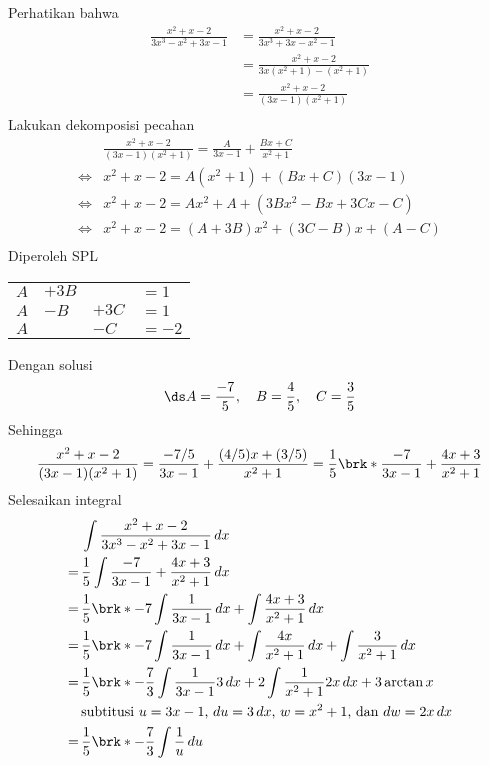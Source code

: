 \begin{enumerate}[leftmargin=*, label={\arabic*}.]
\begin{enumerate}[label={\alph*}.]
    Perhatikan bahwa 
    \begin{align*}
        \frac{x^{2}+x-2}{3x^{3}-x^{2}+3x-1} 
        &= \frac{x^{2}+x-2}{3x^{3}+3x-x^{2}-1}\\
        &= \frac{x^{2}+x-2}{3x(x^{2}+1)-(x^{2}+1)}\\
        &= \frac{x^{2}+x-2}{(3x-1)(x^{2}+1)}\\
    \end{align*}
    Lakukan dekomposisi pecahan
    \begin{align*}
        &\frac{x^{2}+x-2}{(3x-1)(x^{2}+1)} 
        = \frac{A}{3x-1}+\frac{Bx+C}{x^{2}+1}\\
        \iff & x^{2}+x-2 = A(x^{2}+1)+(Bx+C)(3x-1)\\
        \iff & x^{2}+x-2 = Ax^{2}+A+(3Bx^{2}-Bx+3Cx-C)\\
        \iff & x^{2}+x-2 = (A+3B)x^{2}+(3C-B)x+(A-C)\\
    \end{align*}
    Diperoleh SPL
    \begin{center}
    \begin{tabular}{llll}
        $A$ &$+3B$ & &$=1$\\
        $A$ &$-B$ &$+3C$ &$=1$\\
        $A$ & &$-C$ &$=-2$
    \end{tabular}
    \end{center}
    Dengan solusi 
    \[
    \ds A=\frac{-7}{5},\quad B=\frac{4}{5},\quad C=\frac{3}{5}
    \]
    Sehingga
    \[
        \frac{x^{2}+x-2}{(3x-1)(x^{2}+1)} 
        = \frac{-7/5}{3x-1}+\frac{(4/5)x+(3/5)}{x^{2}+1}
        = \frac{1}{5}\brk*{\frac{-7}{3x-1}+\frac{4x+3}{x^{2}+1}}
    \]
    Selesaikan integral
    \begin{align*}
        &\int \frac{x^{2}+x-2}{3x^{3}-x^{2}+3x-1}\,dx\\
        =\,&\frac{1}{5}\int\frac{-7}{3x-1}+\frac{4x+3}{x^{2}+1}\,dx\\
        =\,&\frac{1}{5}\brk*{-7\int\frac{1}{3x-1}\,dx
        +\int\frac{4x+3}{x^{2}+1}\,dx}\\
        =\,&\frac{1}{5}\brk*{-7\int\frac{1}{3x-1}\,dx
        +\int\frac{4x}{x^{2}+1}\,dx+\int\frac{3}{x^{2}+1}\,dx}\\
        =\,&\frac{1}{5}\brk*{-\frac{7}{3}\int\frac{1}{3x-1}3\,dx
        +2\int\frac{1}{x^{2}+1}2x\,dx+3\arctan x}\\
        &\text{subtitusi $u=3x-1$, $du=3\,dx$, $w=x^{2}+1$, dan $dw=2x\,dx$}\\
        =\,&\frac{1}{5}\brk*{-\frac{7}{3}\int\frac{1}{u}\,du
}
\end{align*}
\end{enumerate}
\end{enumerate}
